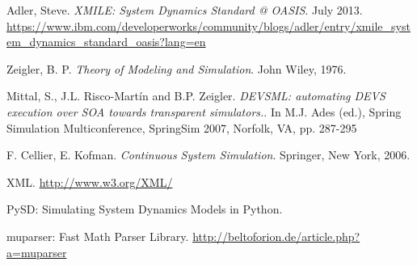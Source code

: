 \begin{thebibliography}{9}

  Adler, Steve. \textit{XMILE: System Dynamics Standard @ OASIS}. July 2013.   \url{https://www.ibm.com/developerworks/community/blogs/adler/entry/xmile_system_dynamics_standard_oasis?lang=en}

  Zeigler, B. P. \textit{Theory of Modeling and Simulation}. John Wiley, 1976.

  Mittal, S., J.L. Risco-Martín and B.P. Zeigler. \textit{DEVSML: automating DEVS execution over SOA towards transparent simulators.}. In M.J. Ades (ed.), Spring Simulation Multiconference, SpringSim 2007, Norfolk, VA, pp. 287-295

 F. Cellier, E. Kofman. \textit{Continuous System Simulation}. Springer, New York, 2006.

  XML. \url{http://www.w3.org/XML/}
 
 PySD: Simulating System Dynamics Models in Python. 
 
 muparser: Fast Math Parser Library. \url{http://beltoforion.de/article.php?a=muparser}


\end{thebibliography}